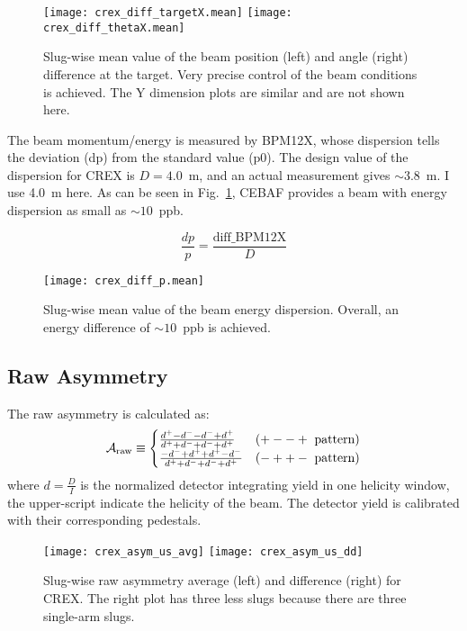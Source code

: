 \begin{figure}[!h]
    \centering
    \texttt{[image: crex\_diff\_targetX.mean]}
    \texttt{[image: crex\_diff\_thetaX.mean]}
    \caption[Slug-wise plot of beam position and angle]
    {Slug-wise mean value of the beam position (left) and angle (right) 
    difference at the target. 
    Very precise control of the beam conditions is achieved.
    The Y dimension plots are similar and are not shown here.}
\end{figure}

The beam momentum/energy is measured by BPM12X, whose dispersion tells the deviation
(dp) from the standard value (p0). The design value of the dispersion for CREX is
$D = 4.0$~m, and an actual measurement gives $\sim3.8$~m. I use 4.0~m here.
As can be seen in Fig.~\ref{fig:crex_diff_p}, CEBAF provides a beam with energy 
dispersion as small as $\sim10$~ppb.

\begin{equation}
    \frac{dp}{p} = \frac{\text{diff\_BPM12X}}{D}
\end{equation}

\begin{figure}[!h]
    \centering
    \texttt{[image: crex\_diff\_p.mean]}
    \caption{Slug-wise mean value of the beam energy dispersion. Overall, 
    an energy difference of $\sim 10$~ppb is achieved. }
    \label{fig:crex_diff_p}
\end{figure}

\subsection{Raw Asymmetry}
The raw asymmetry is calculated as:
\begin{equation}
    \CA_{\text{raw}} \equiv 
    \begin{cases}
	\frac{d^+ - d^- - d^- + d^+}{d^+ + d^- + d^- + d^+}	& (+--+\ \text{pattern})    \\
	\frac{-d^- + d^+ + d^+ - d^-}{d^+ + d^- + d^- + d^+}	& (-++-\ \text{pattern})    \\
    \end{cases}
\end{equation}
where $d=\frac{D}{I}$ is the normalized detector integrating yield in one helicity
window, the upper-script indicate the helicity of the beam. The detector yield is
calibrated with their corresponding pedestals. 
\begin{figure}[!h]
    \centering
    \texttt{[image: crex\_asym\_us\_avg]}
    \texttt{[image: crex\_asym\_us\_dd]}
    \caption{Slug-wise raw asymmetry average (left) and difference (right) for CREX. 
    The right plot has three less slugs because there are three single-arm slugs.}
\end{figure}

